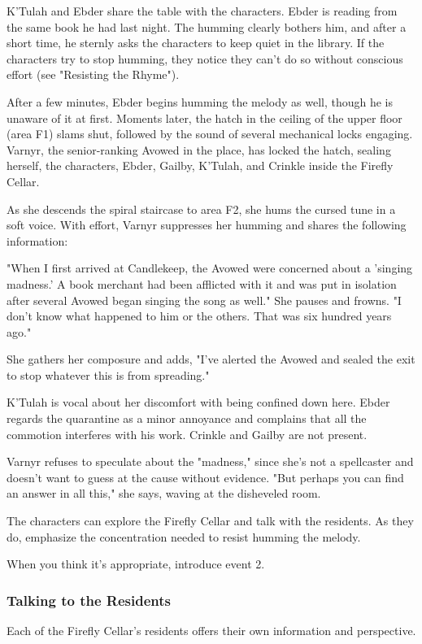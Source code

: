 \documentclass[10pt,a4paper,twoside,bg=print,twocolumn,openany,nodeprecatedcode]{dndbook}
\begin{document}
K'Tulah and Ebder share the table with the characters. Ebder is reading from the same book he had last night. The humming clearly bothers him, and after a short time, he sternly asks the characters to keep quiet in the library. If the characters try to stop humming, they notice they can't do so without conscious effort (see "Resisting the Rhyme").

After a few minutes, Ebder begins humming the melody as well, though he is unaware of it at first. Moments later, the hatch in the ceiling of the upper floor (area F1) slams shut, followed by the sound of several mechanical locks engaging. Varnyr, the senior-ranking Avowed in the place, has locked the hatch, sealing herself, the characters, Ebder, Gailby, K'Tulah, and Crinkle inside the Firefly Cellar.

As she descends the spiral staircase to area F2, she hums the cursed tune in a soft voice. With effort, Varnyr suppresses her humming and shares the following information:

\begin{DndReadAloud}{}
"When I first arrived at Candlekeep, the Avowed were concerned about a 'singing madness.' A book merchant had been afflicted with it and was put in isolation after several Avowed began singing the song as well." She pauses and frowns. "I don't know what happened to him or the others. That was six hundred years ago."

She gathers her composure and adds, "I've alerted the Avowed and sealed the exit to stop whatever this is from spreading."

\end{DndReadAloud}

K'Tulah is vocal about her discomfort with being confined down here. Ebder regards the quarantine as a minor annoyance and complains that all the commotion interferes with his work. Crinkle and Gailby are not present.

Varnyr refuses to speculate about the "madness," since she's not a spellcaster and doesn't want to guess at the cause without evidence. "But perhaps you can find an answer in all this," she says, waving at the disheveled room.

The characters can explore the Firefly Cellar and talk with the residents. As they do, emphasize the concentration needed to resist humming the melody.

When you think it's appropriate, introduce event 2.

\subsubsection{Talking to the Residents}
Each of the Firefly Cellar's residents offers their own information and perspective.
\end{document}
